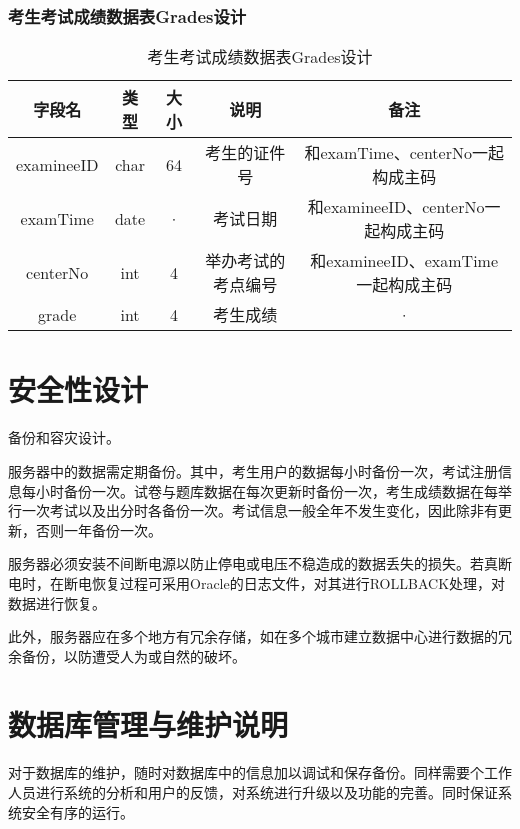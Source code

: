 \subsubsection{考生考试成绩数据表Grades设计}
\begin{table}[htbp]
\centering
\caption{考生考试成绩数据表Grades设计} \label{tab:order-database}
\begin{tabular}{|c|c|c|c|c|}
    \hline
    字段名 & 类型 & 大小 & 说明 & 备注 \\
    \hline
    examineeID & char & 64 & 考生的证件号 & 和examTime、centerNo一起构成主码 \\
    \hline
    examTime & date & · & 考试日期 & 和examineeID、centerNo一起构成主码 \\
    \hline
    centerNo & int & 4 & 举办考试的考点编号 & 和examineeID、examTime一起构成主码 \\
    \hline
    grade & int & 4 & 考生成绩 & · \\
    \hline
\end{tabular}
\end{table}



\section{安全性设计}
备份和容灾设计。

服务器中的数据需定期备份。其中，考生用户的数据每小时备份一次，考试注册信息每小时备份一次。试卷与题库数据在每次更新时备份一次，考生成绩数据在每举行一次考试以及出分时各备份一次。考试信息一般全年不发生变化，因此除非有更新，否则一年备份一次。

服务器必须安装不间断电源以防止停电或电压不稳造成的数据丢失的损失。若真断电时，在断电恢复过程可采用Oracle的日志文件，对其进行ROLLBACK处理，对数据进行恢复。

此外，服务器应在多个地方有冗余存储，如在多个城市建立数据中心进行数据的冗余备份，以防遭受人为或自然的破坏。

\section{数据库管理与维护说明}
对于数据库的维护，随时对数据库中的信息加以调试和保存备份。同样需要个工作人员进行系统的分析和用户的反馈，对系统进行升级以及功能的完善。同时保证系统安全有序的运行。